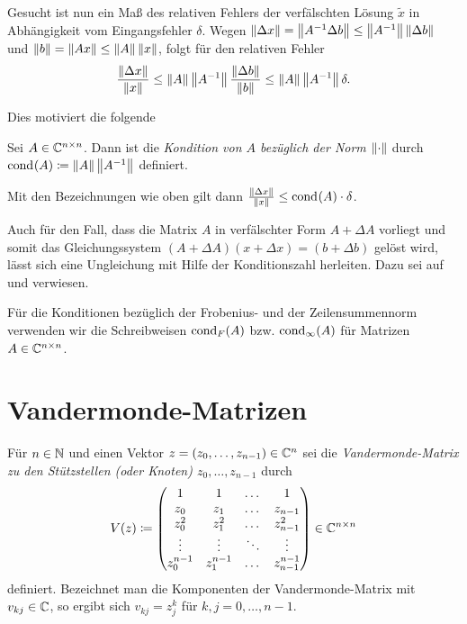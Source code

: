 \noindent Gesucht ist nun ein Maß des relativen Fehlers der verfälschten Lösung
$\tilde{x}$ in Abhängigkeit vom Eingangsfehler $\delta$.
Wegen $ \norm{\Delta x} = \norm{A^{-1} \Delta b} \leq \norm{A^{-1}} \norm{\Delta b} $
und $ \norm{b} = \norm{A x} \leq \norm{A} \norm{x} $,
folgt für den relativen Fehler
\[
    \frac{\norm{\Delta x}}{\norm{x}}
    \leq \norm{A} \norm{A^{-1}} \frac{\norm{\Delta b}}{\norm{b}}
    \leq \norm{A} \norm{A^{-1}} \delta.
\]

\noindent Dies motiviert die folgende
\begin{mydef}
    Sei $A \in \C^{n \times n}$.
    Dann ist die \emph{Kondition von $A$ bezüglich der Norm $\emptynorm$} durch
    $\cond{A} \defeq \norm{A} \norm{A^{-1}}$
    definiert.
\end{mydef}

\begin{remark}
    Mit den Bezeichnungen wie oben gilt dann ${\frac{\norm{\Delta x}}{\norm{x}} \leq \cond{A} \cdot \delta }$.
\end{remark}

\begin{remark}
    Auch für den Fall, dass die Matrix $A$ in verfälschter Form $A + \Delta A$
    vorliegt und somit das Gleichungssystem $(A + \Delta A)(x + \Delta x) = (b
    + \Delta b)$ gelöst wird, lässt sich eine Ungleichung mit Hilfe der
    Konditionszahl herleiten. Dazu sei auf \cite[S. 203ff]{stoer1} und \cite[S.
    54ff]{schaback} verwiesen.
\end{remark}

\begin{notation}
    Für die Konditionen bezüglich der Frobenius- und der Zeilensummennorm
    verwenden wir die Schreibweisen $ \cond[F]{A} $ bzw. $\cond[\infty]{A}$ für
    Matrizen $A \in \C^{n\times n}$.
\end{notation}

\section{Vandermonde-Matrizen}

\begin{mydef}
    Für $n \in \N$ und einen Vektor ${z = (z_0, \dots, z_{n-1}) \in \Cn}$
    sei die
    \emph{Vandermonde-Matrix zu den Stützstellen (oder Knoten) $z_0, \dots, z_{n-1}$}
    durch
    \[
        \Vand{z} \defeq \begin{pmatrix}
            1         & 1         & \dots & 1 \\
            z_0       & z_1       & \dots & z_{n-1} \\
            z_0^2     & z_1^2     & \dots & z_{n-1}^2 \\
            \vdots    & \vdots    & \ddots & \vdots \\
            z_0^{n-1} & z_1^{n-1} & \dots & z_{n-1}^{n-1}
        \end{pmatrix} \in \C^{n \times n}
    \]
    definiert.
    Bezeichnet man die Komponenten der Vandermonde-Matrix mit
    $v_{kj} \in \C$, so ergibt sich
    $ v_{kj} = z_j^k $ für $k, j = 0, \dots, n-1$.

\end{mydef}

